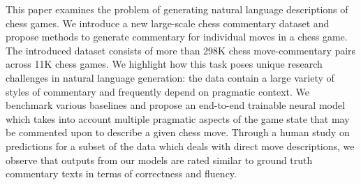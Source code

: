 This paper examines the problem of generating natural language descriptions of chess games. We introduce a new large-scale chess commentary dataset and propose methods to generate commentary for individual moves in a chess game. The introduced dataset consists of more than 298K chess move-commentary pairs across 11K chess games. We highlight how this task poses unique research challenges in natural language generation: the data contain a large variety of styles of commentary and frequently depend on pragmatic context. We benchmark various baselines and propose an end-to-end trainable neural model which takes into account multiple pragmatic aspects of the game state that may be commented upon to describe a given chess move. Through a human study on predictions for a subset of the data which deals with direct move descriptions, we observe that outputs from our models are rated similar to ground truth commentary texts in terms of correctness and fluency.
